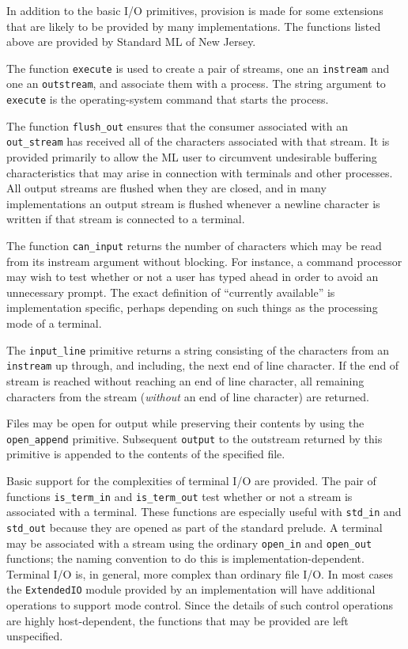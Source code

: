 In addition to the basic I/O primitives, provision is made for some
extensions that are likely to be provided by many implementations.
The functions listed above are provided by Standard ML of New Jersey.

The function \verb"execute" is used to create a pair of streams, one an
\verb"instream" and one an \verb"outstream", and associate them with
a process.  The string argument to \verb"execute" is the
operating-system command that starts the process.

The function \verb"flush_out" ensures that the consumer associated
with an \verb"out_stream" has received all of the characters
associated with that stream.  It is provided primarily to allow the
ML user to circumvent undesirable buffering characteristics that may
arise in connection with terminals and other processes.  All output
streams are flushed when they are closed, and in many implementations
an output stream is flushed whenever a newline character is written
if that stream is connected to a terminal.

The function \verb"can_input" returns the number of characters
which may be read from its instream argument without blocking.
For instance, a command processor may wish
to test whether or not a user has typed ahead in order to avoid an
unnecessary prompt.  The exact definition of ``currently available''
is implementation specific, perhaps depending on such things as the
processing mode of a terminal.

The \verb"input_line" primitive returns a string consisting of the
characters from an \verb"instream" up through, and including, the
next end of line character.  If the end of stream is reached without
reaching an end of line character, all remaining characters from the
stream ({\em without} an end of line character) are returned.

Files may be open for output while preserving their contents by using
the \verb"open_append" primitive.  Subsequent \verb"output" to the
outstream returned by this primitive is appended to the contents of
the specified file.

Basic support for the complexities of terminal I/O are provided.  The
pair of functions \verb"is_term_in" and \verb"is_term_out" test
whether or not a stream is associated with a terminal.  These
functions are especially useful with \verb"std_in" and \verb"std_out"
because they are opened as part of the standard prelude.  A terminal
may be associated with a stream using the ordinary \verb"open_in" and
\verb"open_out" functions; the naming convention to do this is
implementation-dependent.  Terminal I/O is, in general, more complex
than ordinary file I/O.   In most cases the \verb"ExtendedIO" module
provided by an implementation will have additional operations to
support mode control.  Since the details of such control operations
are highly host-dependent, the functions that may be provided are
left unspecified.
